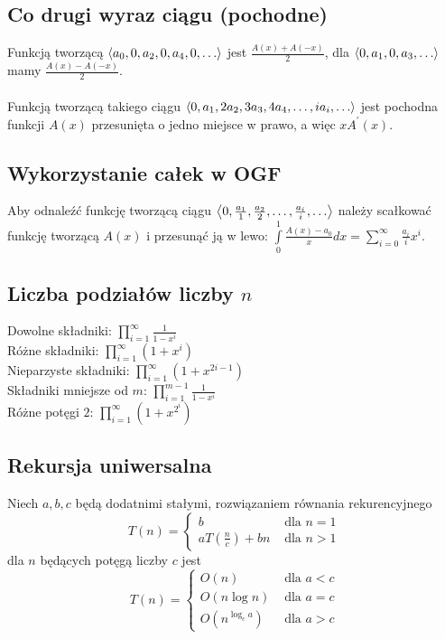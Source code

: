\subsection*{Co drugi wyraz ciągu (pochodne)}
Funkcją tworzącą $\left\langle a_0, 0, a_2, 0, a_4, 0, \ldots \right\rangle$ jest 
$\frac{A(x) + A(-x)}{2}$, dla $\left\langle 0, a_1, 0, a_3, \ldots \right\rangle$ mamy
$\frac{A(x) - A(-x)}{2}$. \\ \\
Funkcją tworzącą takiego ciągu 
$\left\langle 0, a_1, 2a_2, 3a_3, 4a_4, \ldots, ia_i, \ldots \right\rangle$
jest pochodna funkcji $A(x)$ przesunięta o jedno miejsce w prawo, a więc $xA^\prime(x)$.

\subsection*{Wykorzystanie całek w OGF}
Aby odnaleźć funkcję tworzącą ciągu 
$\left\langle 0, \frac{a_1}{1}, \frac{a_2}{2}, \ldots, \frac{a_i}{i}, \ldots \right\rangle$ należy
scałkować funkcję tworzącą $A(x)$ i przesunąć ją w lewo:
$\int\limits_{0}^{1} \frac{A(x) - a_0}{x} dx = 
\sum\limits_{i=0}^{\infty} \frac{a_i}{i} x^{i}$.

\subsection*{Liczba podziałów liczby $n$}
Dowolne składniki: $\prod\limits_{i=1}^{\infty} \frac{1}{1 - x^i}$ \\
Różne składniki: $\prod\limits_{i=1}^{\infty} (1 + x^i)$ \\
Nieparzyste składniki: $\prod\limits_{i=1}^{\infty} (1 + x^{2i-1})$ \\
Składniki mniejsze od $m$: $\prod\limits_{i=1}^{m-1} \frac{1}{1 - x^i}$ \\
Różne potęgi $2$: $\prod\limits_{i=1}^{\infty} (1 + x^{2^i})$

\subsection*{Rekursja uniwersalna}
Niech $a, b, c$ będą dodatnimi stałymi, rozwiązaniem równania rekurencyjnego
$$
T(n) =
\begin{cases}
    b                    &\text{ dla } n = 1\\
    aT(\frac{n}{c}) + bn &\text{ dla } n > 1
\end{cases}
$$
dla $n$ będących potęgą liczby $c$ jest
$$
T(n) =
\begin{cases}
    O(n)                         &\text{ dla } a < c \\
    O(n \log n)                  &\text{ dla } a = c \\
    O\left( n^{\log_c a} \right) &\text{ dla } a > c
\end{cases}
$$